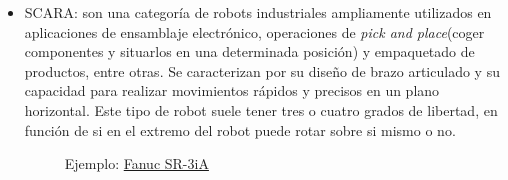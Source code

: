 \begin{itemize}
\item \ac{SCARA}: son una categoría de robots industriales ampliamente utilizados en aplicaciones de ensamblaje electrónico, operaciones de 
\textit{pick and place}(coger componentes y situarlos en una determinada posición) y empaquetado de productos, entre otras.
Se caracterizan por su diseño de brazo articulado y su capacidad para realizar movimientos rápidos 
y precisos en un plano horizontal. Este tipo de robot suele tener tres o cuatro grados de libertad, en función de si en el extremo del 
robot puede rotar sobre si mismo o no. 

\begin{figure} [h!]
  \centering    
  \hspace{3cm}
  \caption[Fanuc]{Ejemplo: \href{https://www.fanuc.eu/uk/en/robots/robot-filter-page/scara-series/scara-sr-3ia}{Fanuc SR-3iA}}
\end{figure}


\end{itemize}

